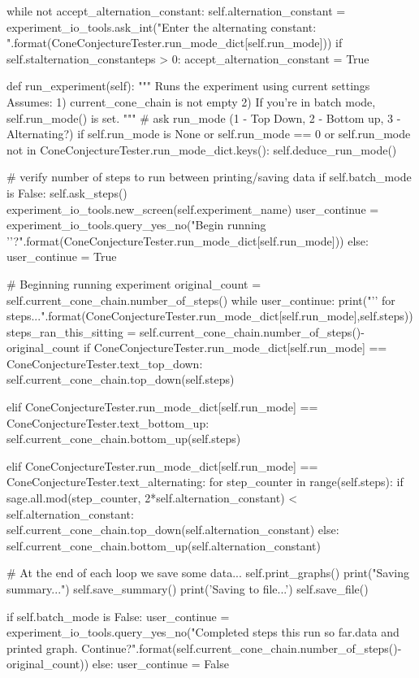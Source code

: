 \documentclass{TC}
\begin{document}
\begin{SAGE}
		while not accept_alternation_constant:
			self.alternation_constant = experiment_io_tools.ask_int("Enter the alternating constant: ".format(ConeConjectureTester.run_mode_dict[self.run_mode]))
			if self.stalternation_constanteps > 0:
				accept_alternation_constant = True


	def run_experiment(self):
		""" Runs the experiment using current settings 
			Assumes:
			1) current_cone_chain is not empty
			2) If you're in batch mode, self.run_mode() is set.
		"""
		# ask run_mode (1 - Top Down, 2 - Bottom up, 3 - Alternating?)
		if self.run_mode is None or self.run_mode == 0 or self.run_mode not in ConeConjectureTester.run_mode_dict.keys():
			self.deduce_run_mode()


		# verify number of steps to run between printing/saving data
		if self.batch_mode is False:
			self.ask_steps()
			experiment_io_tools.new_screen(self.experiment_name)
			user_continue = experiment_io_tools.query_yes_no("Begin running '{}'?".format(ConeConjectureTester.run_mode_dict[self.run_mode]))
		else:
			user_continue = True

		# Beginning running experiment
		original_count = self.current_cone_chain.number_of_steps()
		while user_continue:
			print("\trunning '{}' for {} steps...".format(ConeConjectureTester.run_mode_dict[self.run_mode],self.steps))
			steps_ran_this_sitting = self.current_cone_chain.number_of_steps()-original_count
			if ConeConjectureTester.run_mode_dict[self.run_mode] == ConeConjectureTester.text_top_down:
				self.current_cone_chain.top_down(self.steps)
			
			elif ConeConjectureTester.run_mode_dict[self.run_mode] == ConeConjectureTester.text_bottom_up:
				self.current_cone_chain.bottom_up(self.steps)

			elif ConeConjectureTester.run_mode_dict[self.run_mode] == ConeConjectureTester.text_alternating:
				for step_counter in range(self.steps):
					if sage.all.mod(step_counter, 2*self.alternation_constant) < self.alternation_constant:
						self.current_cone_chain.top_down(self.alternation_constant)
					else:
						self.current_cone_chain.bottom_up(self.alternation_constant)

			# At the end of each loop we save some data...
			self.print_graphs()
			print("Saving summary...")
			self.save_summary()
			print('Saving to file...')
			self.save_file()
		
			if self.batch_mode is False:
				user_continue = experiment_io_tools.query_yes_no("Completed {} steps this run so far.\n\tSaved data and printed graph. Continue?".format(self.current_cone_chain.number_of_steps()-original_count))
 			else:
 				user_continue = False




\end{SAGE}
\end{document}
